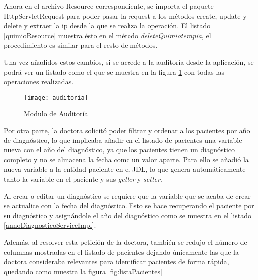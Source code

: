 

Ahora en el archivo Resource correspondiente, se importa el paquete HttpServletRequest para poder pasar la request a los métodos create, update y delete y extraer la ip desde la que se realiza la operación. El listado \ref{quimioResource} muestra ésto en el método \emph{deleteQuimioterapia}, el procedimiento es similar para el resto de métodos.



Una vez añadidos estos cambios, si se accede a la auditoría desde la aplicación, se podrá ver un listado como el que se muestra en la figura \ref{fig:auditoria} con todas las operaciones realizadas.

\begin{figure}[!h]
\begin{center}
\texttt{[image: auditoria]}
\caption{Modulo de Auditoría}
\label{fig:auditoria}
\end{center}
\end{figure}

Por otra parte, la doctora solicitó poder filtrar y ordenar a los pacientes por año de diagnóstico, lo que implicaba añadir en el listado de pacientes una variable nueva con el año del diagnóstico, ya que los pacientes tienen un diagnóstico completo y no se almacena la fecha como un valor aparte. Para ello se añadió la nueva variable a la entidad paciente en el JDL, lo que genera automáticamente tanto la variable en el paciente y sus \emph{getter} y \emph{setter}.

Al crear o editar un diagnóstico se requiere que la variable que se acaba de crear se actualice con la fecha del diagnóstico. Esto se hace recuperando el paciente por su diagnóstico y asignándole el año del diagnóstico como se muestra en el listado \ref{annoDiagnosticoServiceImpl}.



Además, al resolver esta petición de la doctora, también se redujo el número de columnas mostradas en el listado de pacientes dejando únicamente las que la doctora consideraba relevantes para identificar pacientes de forma rápida, quedando como muestra la figura \ref{fig:listaPacientes}

